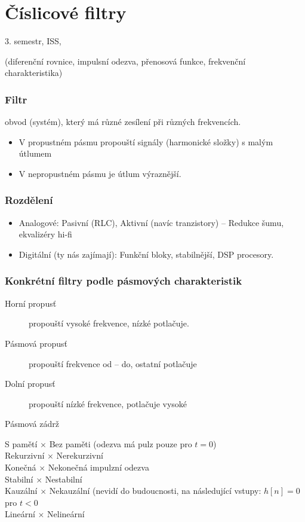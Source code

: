 \documentclass[a4paper, 11pt]{report}
\begin{document}
\chapter{Číslicové filtry} \label{cha:15}

3. semestr, ISS, 

(diferenční rovnice, impulsní odezva, přenosová funkce, frekvenční charakteristika)

\subsection{Filtr}
obvod (systém), který má různé zesílení při různých frekvencích.
\begin{itemize}
	\item V propustném pásmu propouští signály (harmonické složky) s malým útlumem
	\item V nepropustném pásmu je útlum výraznější.
\end{itemize}

\subsection{Rozdělení}
\begin{itemize}
	\item Analogové: Pasivní (RLC), Aktivní (navíc tranzistory) -- Redukce šumu, ekvalizéry hi-fi
	\item Digitální (ty nás zajímají): Funkční bloky, stabilnější, DSP procesory.
\end{itemize}

\subsection{Konkrétní filtry podle pásmových charakteristik}
\begin{description}
	\item[Horní propusť] propouští vysoké frekvence, nízké potlačuje.
	\item[Pásmová propusť] propouští frekvence od -- do, ostatní potlačuje
	\item[Dolní propusť] propouští nízké frekvence, potlačuje vysoké
	\item[Pásmová zádrž] 
\end{description}

S pamětí $\times$ Bez paměti (odezva má pulz pouze pro $t = 0$) \\
Rekurzivní $\times$ Nerekurzivní\\
Konečná $\times$ Nekonečná impulzní odezva\\
Stabilní $\times$ Nestabilní\\
Kauzální $\times$ Nekauzální (nevidí do budoucnosti, na následující vstupy: $h[n] = 0$ pro $t < 0$\\
Lineární $\times$ Nelineární
\end{document}
